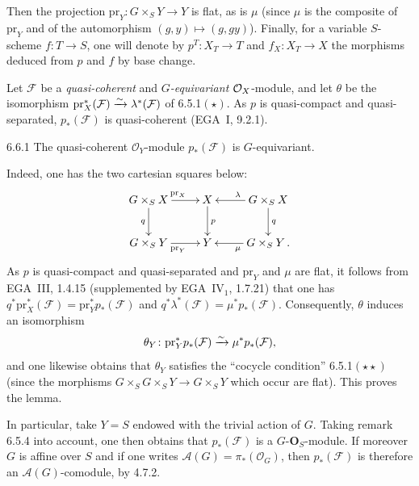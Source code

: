 Then the projection \(\mathrm{pr}_{Y}\colon G\times_{S}Y\to Y\) is flat, as is
\(\mu\) (since \(\mu\) is the composite of \(\mathrm{pr}_{Y}\) and of the
automorphism \((g,y)\mapsto(g,gy)\)). Finally, for a variable \(S\)-scheme
\(f\colon T\to S\), one will denote by \(p^{T}\colon X_{T}\to T\) and
\(f_{X}\colon X_{T}\to X\) the morphisms deduced from \(p\) and \(f\) by base
change.

Let \(\mathcal{F}\) be a \emph{quasi-coherent} and \emph{\(G\)-equivariant}
\(\mathcal{O}_X\)-module,
and let \(\theta\) be the isomorphism
\(\mathrm{pr}_{X}^{*}(\mathcal{F})\xrightarrow{\sim}\lambda^{*}(\mathcal{F})\) of
6.5.1\((\star)\). As \(p\) is quasi-compact and quasi-separated,
\(p_{*}(\mathcal{F})\) is quasi-coherent (\cf EGA~I, 9.2.1).

\begin{lemma}{6.6.1}\label{I.6.6.1}
The quasi-coherent \(\mathcal{O}_{Y}\)-module \(p_{*}(\mathcal{F})\) is
\(G\)-equivariant.
\end{lemma}

Indeed, one has the two cartesian squares below:
\[
\xymatrix{
G\times_{S}X \ar[r]^{\mathrm{pr}_{X}} \ar[d]_{q}
  & X \ar[d]^{p}
  & G\times_{S}X \ar[l]_{\lambda} \ar[d]^{q} \\
G\times_{S}Y \ar[r]_{\mathrm{pr}_{Y}}
  & Y
  & G\times_{S}Y \ar[l]^{\mu}\,.
}
\]
As \(p\) is quasi-compact and quasi-separated and \(\mathrm{pr}_{Y}\) and
\(\mu\) are flat, it follows from EGA~III, 1.4.15 (supplemented by
EGA~IV\(_{1}\), 1.7.21) that one has
\(q^{*}\mathrm{pr}_{X}^{*}(\mathcal{F})=\mathrm{pr}_{Y}^{*}p_{*}(\mathcal{F})\)
and \(q^{*}\lambda^{*}(\mathcal{F})=\mu^{*}p_{*}(\mathcal{F})\). Consequently,
\(\theta\) induces an isomorphism
\[
\theta_{Y}\colon\mathrm{pr}_{Y}^{*}p_{*}(\mathcal{F})
  \xrightarrow{\sim}\mu^{*}p_{*}(\mathcal{F}),
\]
and one likewise obtains that \(\theta_{Y}\) satisfies the ``cocycle
condition'' 6.5.1\((\star\star)\) (since the morphisms
\(G\times_{S}G\times_{S}Y\to G\times_{S}Y\) which occur are flat). This proves
the lemma.

In particular, take \(Y=S\) endowed with the trivial action of \(G\). Taking
remark 6.5.4 into account, one then obtains that \(p_{*}(\mathcal{F})\) is a
\(G\text{-}\mathbf{O}_{S}\)-module. If moreover \(G\) is affine over \(S\) and
if one writes \(\mathcal{A}(G)=\pi_{*}(\mathcal{O}_{G})\), then
\(p_{*}(\mathcal{F})\) is therefore an \(\mathcal{A}(G)\)-comodule, by 4.7.2.

